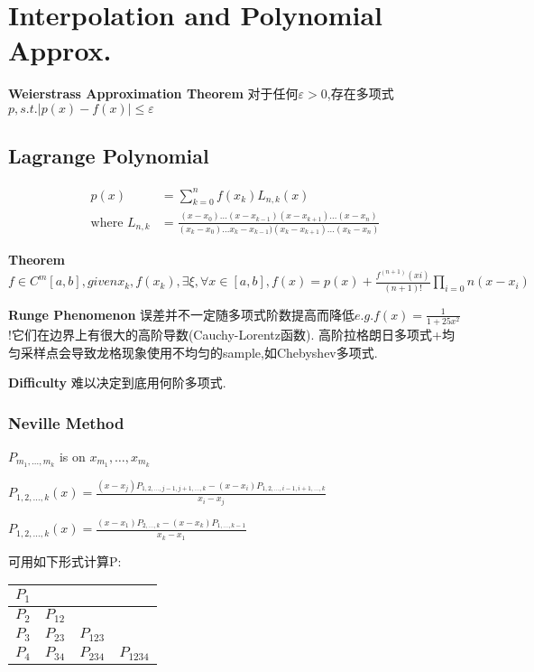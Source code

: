 \documentclass{article}
\begin{document}
\section{Interpolation and Polynomial Approx.}

\textbf{Weierstrass Approximation Theorem} 对于任何$\varepsilon>0$,存在多项式$p,s.t.|p(x)-f(x)|\le \varepsilon$

\subsection{Lagrange Polynomial}

$$
    \begin{aligned}
        p(x)                  & =\sum_{k=0}^n f(x_k) L_{n,k}(x)                                                                               \\
        \text{where } L_{n,k} & =\frac{(x-x_0)\dots (x-x_{k-1})(x-x_{k+1})\dots(x-x_n)}{(x_k-x_0)\dots x_k-x_{k-1})(x_k-x_{k+1})...(x_k-x_n)}
    \end{aligned}
$$

\textbf{Theorem} $f\in C^m[a,b], given {x_k, f(x_k)},\exists \xi, \forall x\in [a,b],f(x)=p(x)+\frac{f^{(n+1)}(xi)}{(n+1)!}\prod_{i=0}{n}(x-x_i)$

\textbf{Runge Phenomenon} 误差并不一定随多项式阶数提高而降低$e.g. f(x)=\frac{1}{1+25x^2}$!它们在边界上有很大的高阶导数(Cauchy-Lorentz函数). 高阶拉格朗日多项式+均匀采样点会导致龙格现象\tRarr 使用不均匀的sample,如Chebyshev多项式.

\textbf{Difficulty} 难以决定到底用何阶多项式.

\subsubsection{Neville Method}

 $P_{m_1,\dots,m_k}$ is \lp on ${x_{m_1},\dots,{x_{m_k}}}$

\trm
$
    P_{1,2,\dots,k}(x)=\frac{(x-x_j)P_{1,2,\dots,j-1,j+1,\dots,k}-(x-x_i)P_{1,2,\dots,i-1,i+1,\dots,k}}{x_i-x_j}
$

\coro $
    P_{1,2,\dots,k}(x)=\frac{(x-x_1)P_{2,\dots,k}-(x-x_k)P_{1,\dots,k-1}}{x_k-x_1}
$

可用如下形式计算P:
\begin{tabular}{c|c|c|c}
    $P_1$                                       \\
    \hline
    $P_2$   & $P_{12}$                          \\
    \hline
    $P_{3}$ & $P_{23}$ & $P_{123}$              \\
    \hline
    $P_4$   & $P_{34}$ & $P_{234}$ & $P_{1234}$ \\
\end{tabular}
\end{document}

